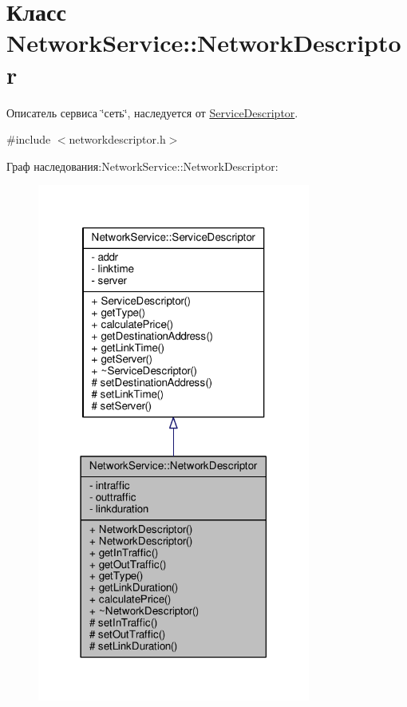 \hypertarget{class_network_service_1_1_network_descriptor}{}\section{Класс Network\+Service\+:\+:Network\+Descriptor}
\label{class_network_service_1_1_network_descriptor}


Описатель сервиса \char`\"{}сеть\char`\"{}, наследуется от \hyperlink{class_network_service_1_1_service_descriptor}{Service\+Descriptor}.  




{\ttfamily \#include $<$networkdescriptor.\+h$>$}



Граф наследования\+:Network\+Service\+:\+:Network\+Descriptor\+:\nopagebreak
\begin{figure}[H]
\begin{center}
\leavevmode
\includegraphics[width=254pt]{class_network_service_1_1_network_descriptor__inherit__graph}
\end{center}
\end{figure}


